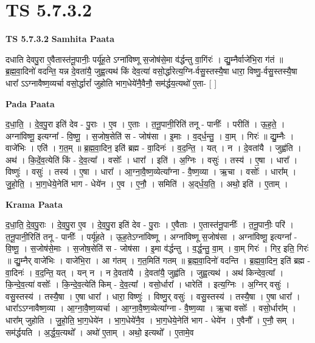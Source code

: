 \documentclass[17pt]{extarticle}
\begin{document}
\section{ TS 5.7.3.2 }

\textbf{TS 5.7.3.2 } \newline
\textbf{Samhita Paata} \newline

दधाति देवपु॒रा ए॒वैतास्त॑नू॒पानीः॒ पर्यू॑ह॒ते ऽग्ना॑विष्णू स॒जोष॑से॒मा व॑र्द्धन्तु वा॒गिंरः॑ । द्यु॒म्नैर्वाजे॑भि॒रा ग॑तं ॥ ब्र॒ह्म॒वा॒दिनो॑ वदन्ति॒ यन्न दे॒वता॑यै॒ जुह्व॒त्यथ॑ किं देव॒त्या॑ वसो॒र्द्धारेत्य॒ग्नि-र्वसु॒स्तस्यै॒षा धारा॒ विष्णु॒-र्वसु॒स्तस्यै॒षा धारा᳚ ऽऽग्नावैष्ण॒व्यर्चा वसो॒र्द्धारां᳚ जुहोति भाग॒धेये॑नै॒वैनौ॒ सम॑र्द्धय॒त्यथो॑ ए॒ता- [  ] \newline

\textbf{Pada Paata} \newline

द॒धा॒ति॒ । दे॒व॒पु॒रा इति॑ देव - पु॒राः । ए॒व । ए॒ताः । त॒नू॒पानी॒रिति॑ तनू - पानीः᳚ । परीति॑ । ऊ॒ह॒ते॒ । अग्ना॑विष्णू॒ इत्यग्ना᳚ - वि॒ष्णू॒ । स॒जोष॒सेति॑ स - जोष॑सा । इ॒माः । व॒द्‌र्ध॒न्तु॒ । वा॒म् । गिरः॑ ॥ द्यु॒म्नैः । वाजे॑भिः । एति॑ । ग॒त॒म् ॥ ब्र॒ह्म॒वा॒दिन॒ इति॑ ब्रह्म - वा॒दिनः॑ । व॒द॒न्ति॒ । यत् । न । दे॒वता॑यै । जुह्व॑ति । अथ॑ । कि॒दें॒व॒त्येति॑ किं - दे॒व॒त्या᳚ । वसोः᳚ । धारा᳚ । इति॑ । अ॒ग्निः । वसुः॑ । तस्य॑ । ए॒षा । धारा᳚ । विष्णुः॑ । वसुः॑ । तस्य॑ । ए॒षा । धारा᳚ । आ॒ग्ना॒वै॒ष्ण॒व्येत्या᳚ग्ना - वै॒ष्ण॒व्या । ऋ॒चा । वसोः᳚ । धारा᳚म् । जु॒हो॒ति॒ । भा॒ग॒धेये॒नेति॑ भाग - धेये॑न । ए॒व । ए॒नौ॒ । समिति॑ । अ॒द्‌र्ध॒य॒ति॒ । अथो॒ इति॑ । ए॒ताम् ।  \newline


\textbf{Krama Paata} \newline

द॒धा॒ति॒ दे॒व॒पु॒राः । दे॒व॒पु॒रा ए॒व । दे॒व॒पु॒रा इति॑ देव - पु॒राः । ए॒वैताः । ए॒तास्त॑नू॒पानीः᳚ । त॒नू॒पानीः॒ परि॑ । त॒नू॒पानी॒रिति॑ तनू - पानीः᳚ । पर्यू॑हते । ऊ॒ह॒तेऽग्ना॑विष्णू । अग्ना॑विष्णू स॒जोष॑सा । अग्ना॑विष्णू॒ इत्यग्ना᳚ - वि॒ष्णू॒ । स॒जोष॑से॒माः । स॒जोष॒सेति॑ स - जोष॑सा । इ॒मा व॑र्द्धन्तु । व॒र्द्ध॒न्तु॒ वा॒म् । वा॒म् गिरः॑ । गिर॒ इति॒ गिरः॑ ॥ द्यु॒म्नैर् वाजे॑भिः । वाजे॑भि॒रा । आ ग॑तम् । ग॒त॒मिति॑ गतम् ॥ ब्र॒ह्म॒वा॒दिनो॑ वदन्ति । ब्र॒ह्म॒वा॒दिन॒ इति॑ ब्रह्म - वा॒दिनः॑ । व॒द॒न्ति॒ यत् । यन् न । न दे॒वता॑यै । दे॒वता॑यै॒ जुह्व॑ति । जुह्व॒त्यथ॑ । अथ॑ किन्देव॒त्या᳚ । कि॒न्दे॒व॒त्या॑ वसोः᳚ । कि॒न्दे॒व॒त्येति॑ किम् - दे॒व॒त्या᳚ । वसो॒र्धारा᳚ । धारेति॑ । इत्य॒ग्निः । अ॒ग्निर् वसुः॑ । वसु॒स्तस्य॑ । तस्यै॒षा । ए॒षा धारा᳚ । धारा॒ विष्णुः॑ । विष्णु॒र् वसुः॑ । वसु॒स्तस्य॑ । तस्यै॒षा । ए॒षा धारा᳚ । धारा᳚ऽऽग्नावैष्ण॒व्या । आ॒ग्ना॒वै॒ष्ण॒व्यर्चा । आ॒ग्ना॒वै॒ष्ण॒व्येत्या᳚ग्ना - वै॒ष्ण॒व्या । ऋ॒चा वसोः᳚ । वसो॒र्धारा᳚म् । धारा᳚म् जुहोति । जु॒हो॒ति॒ भा॒ग॒धेये॑न । भा॒ग॒धेये॑नै॒व । भा॒ग॒धेये॒नेति॑ भाग - धेये॑न । ए॒वैनौ᳚ । ए॒नौ॒ सम् । सम॑र्द्धयति । अ॒र्द्ध॒य॒त्यथो᳚ । अथो॑ ए॒ताम् । अथो॒ इत्यथो᳚ । ए॒तामे॒व \newline
\end{document}
